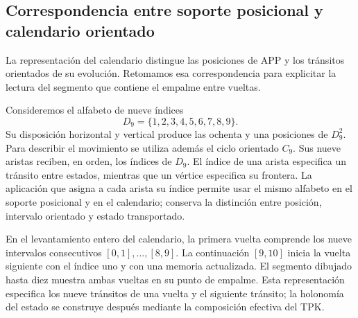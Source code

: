 \subsection{Correspondencia entre soporte posicional y calendario orientado}
\label{ii:ampliacion-posicional-calendario}

La representación del calendario distingue las posiciones de APP y los
tránsitos orientados de su evolución. Retomamos esa correspondencia para
explicitar la lectura del segmento que contiene el empalme entre vueltas.

Consideremos el alfabeto de nueve índices
\[
 D_9=\{1,2,3,4,5,6,7,8,9\}.
\]
Su disposición horizontal y vertical produce las ochenta y una posiciones
de \(D_9^2\). Para describir el movimiento se utiliza además el ciclo
orientado \(C_9\). Sus nueve aristas reciben, en orden, los índices de
\(D_9\). El índice de una arista especifica un tránsito entre estados,
mientras que un vértice especifica su frontera. La aplicación que asigna
a cada arista su índice permite usar el mismo alfabeto en el soporte
posicional y en el calendario; conserva la distinción entre posición,
intervalo orientado y estado transportado.

En el levantamiento entero del calendario, la primera vuelta comprende
los nueve intervalos consecutivos \([0,1],\ldots,[8,9]\). La continuación
\([9,10]\) inicia la vuelta siguiente con el índice uno y con una memoria
actualizada. El segmento dibujado hasta diez muestra ambas vueltas en su
punto de empalme. Esta representación especifica los nueve tránsitos de
una vuelta y el siguiente tránsito; la holonomía del estado se construye
después mediante la composición efectiva del TPK.



